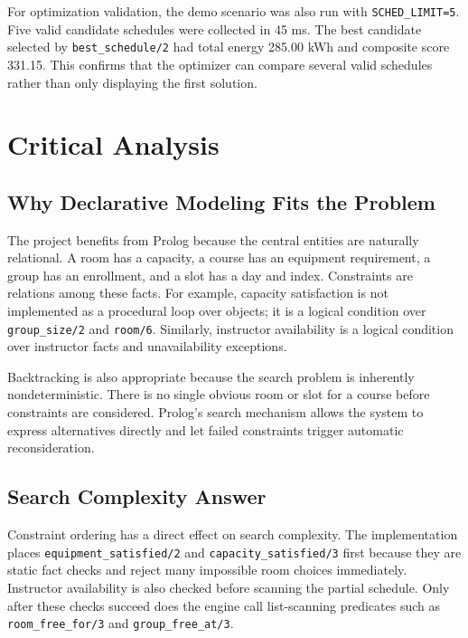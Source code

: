 \documentclass[12pt,a4paper]{article}
\newcommand{\predicate}[1]{\texttt{#1}}
\newcommand{\term}[1]{\texttt{#1}}
\begin{document}
For optimization validation, the demo scenario was also run with \term{SCHED\_LIMIT=5}. Five valid candidate schedules were collected in 45 ms. The best candidate selected by \predicate{best\_schedule/2} had total energy 285.00 kWh and composite score 331.15. This confirms that the optimizer can compare several valid schedules rather than only displaying the first solution.

\section{Critical Analysis}

\subsection{Why Declarative Modeling Fits the Problem}

The project benefits from Prolog because the central entities are naturally relational. A room has a capacity, a course has an equipment requirement, a group has an enrollment, and a slot has a day and index. Constraints are relations among these facts. For example, capacity satisfaction is not implemented as a procedural loop over objects; it is a logical condition over \predicate{group\_size/2} and \predicate{room/6}. Similarly, instructor availability is a logical condition over instructor facts and unavailability exceptions.

Backtracking is also appropriate because the search problem is inherently nondeterministic. There is no single obvious room or slot for a course before constraints are considered. Prolog's search mechanism allows the system to express alternatives directly and let failed constraints trigger automatic reconsideration.

\subsection{Search Complexity Answer}

Constraint ordering has a direct effect on search complexity. The implementation places \predicate{equipment\_satisfied/2} and \predicate{capacity\_satisfied/3} first because they are static fact checks and reject many impossible room choices immediately. Instructor availability is also checked before scanning the partial schedule. Only after these checks succeed does the engine call list-scanning predicates such as \predicate{room\_free\_for/3} and \predicate{group\_free\_at/3}.
\end{document}
